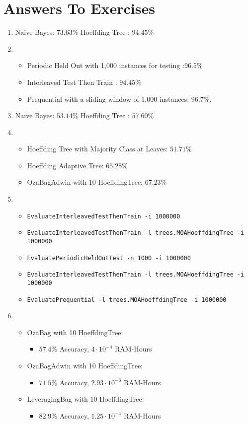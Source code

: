 \documentclass[a4paper,12pt]{article}
\begin{document}
\section{Answers To Exercises}

\begin{enumerate}
 \item Naive Bayes: $73.63\%$ Hoeffding Tree : $ 94.45\%$
 \item \begin{itemize}
        \item Periodic Held Out with 1,000 instances for testing :$96.5\%$
	\item Interleaved Test Then Train : $ 94.45\%$
	\item Prequential with a sliding window of 1,000 instances: $96.7\%$.
       \end{itemize}
\item Naive Bayes: $53.14\%$ Hoeffding Tree : $57.60\%$
\item \begin{itemize}
       \item Hoeffding Tree with Majority Class at Leaves: $51.71\%$
       \item Hoeffding Adaptive Tree: $65.28\%$
	\item OzaBagAdwin with 10 HoeffdingTree: $67.23\%$
      \end{itemize}
\item \begin{itemize}
        \item \texttt{EvaluateInterleavedTestThenTrain -i 1000000}
	\item \texttt{EvaluateInterleavedTestThenTrain -l trees.MOAHoeffdingTree -i 1000000}
	\item \texttt{EvaluatePeriodicHeldOutTest -n 1000 -i 1000000}
	\item \texttt{EvaluateInterleavedTestThenTrain -l trees.MOAHoeffdingTree -i 1000000}
	\item \texttt{EvaluatePrequential -l trees.MOAHoeffdingTree -i 1000000}
       \end{itemize}
\item \begin{itemize}
 \item
 OzaBag with 10 HoeffdingTree:
\begin{itemize} \item  
$57.4\%$ Accuracy, $4 \cdot 10^{-4}$ RAM-Hours
\end{itemize}
 \item
 OzaBagAdwin with 10 HoeffdingTree: 
\begin{itemize} \item  
$71.5\%$ Accuracy, $2.93 \cdot 10^{-6}$ RAM-Hours
\end{itemize}
 \item
 LeveragingBag with 10 HoeffdingTree:
\begin{itemize} \item 
 $82.9\%$ Accuracy, $1.25 \cdot 10^{-4}$  RAM-Hours 
 \end{itemize}
\end{itemize}

\end{enumerate}
\end{document}
